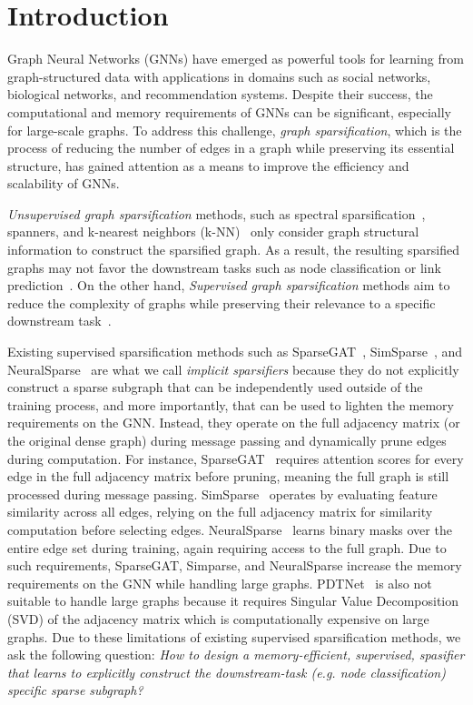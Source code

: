 \section{Introduction}
Graph Neural Networks (GNNs) have emerged as powerful tools for learning from graph-structured data with applications in domains such as social networks, biological networks, and recommendation systems. Despite their success, the computational and memory requirements of GNNs can be significant, especially for large-scale graphs. To address this challenge, \emph{graph sparsification}, which is the process of reducing the number of edges in a graph while preserving its essential structure, has gained attention as a means to improve the efficiency and scalability of GNNs.

\emph{Unsupervised graph sparsification} methods, such as spectral sparsification~\cite{batson2013spectral}, spanners, and k-nearest neighbors (k-NN)~\cite{knnsparse} only consider graph structural information to construct the sparsified graph. As a result, the resulting
sparsified graphs may not favor the downstream tasks such as node classification or link prediction~\cite{zheng2020robust}. On the other hand, \emph{Supervised graph sparsification} methods aim to reduce the complexity of graphs while preserving their relevance to a specific downstream task~\cite{zheng2020robust,luo2021learning,wu2023alleviating,sparsegat}.

Existing supervised sparsification methods such as SparseGAT~\cite{sparsegat}, SimSparse~\cite{wu2023alleviating}, and NeuralSparse~\cite{zheng2020robust} are what we call \emph{implicit sparsifiers} because they do not explicitly construct a sparse subgraph that can be independently used outside of the training process, and more importantly, that can be used to lighten the memory requirements on the GNN. Instead, they operate on the full adjacency matrix (or the original dense graph) during message passing and dynamically prune edges during computation. For instance, SparseGAT~\cite{sparsegat} requires attention scores for every edge in the full adjacency matrix before pruning, meaning the full graph is still processed during message passing. SimSparse~\cite{wu2023alleviating} operates by evaluating feature similarity across all edges, relying on the full adjacency matrix for similarity computation before selecting edges. NeuralSparse~\cite{zheng2020robust} learns binary masks over the entire edge set during training, again requiring access to the full graph.  Due to such requirements, SparseGAT, Simparse, and NeuralSparse increase the memory requirements on the GNN while handling large graphs. PDTNet~\cite{luo2021learning} is also not suitable to handle large graphs because it requires Singular Value Decomposition (SVD) of the adjacency matrix which is computationally expensive on large graphs. Due to these limitations of existing supervised sparsification methods, we ask the following question: \emph{How to design a memory-efficient, supervised, spasifier that learns to explicitly construct the downstream-task (e.g. node classification) specific sparse subgraph?}

